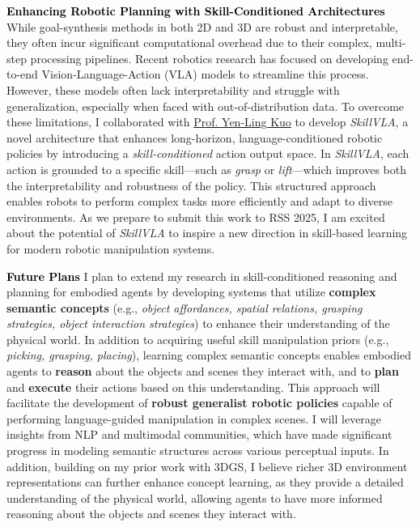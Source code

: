 \documentclass[10pt]{article}
\newcommand{\statement}[1]{\medskip\noindent
  \textcolor{black}{\textbf{#1}}\space
}
\begin{document}
\statement{Enhancing Robotic Planning with Skill-Conditioned Architectures} While goal-synthesis methods in both 2D and 3D are robust and interpretable, they often incur significant computational overhead due to their complex, multi-step processing pipelines. Recent robotics research has focused on developing end-to-end Vision-Language-Action (VLA) models to streamline this process. However, these models often lack interpretability and struggle with generalization, especially when faced with out-of-distribution data. To overcome these limitations, I collaborated with \href{https://yenlingkuo.com/}{Prof. Yen-Ling Kuo} to develop \textit{SkillVLA}, a novel architecture that enhances long-horizon, language-conditioned robotic policies by introducing a \textit{skill-conditioned} action output space. In \textit{SkillVLA}, each action is grounded to a specific skill—such as \textit{grasp} or \textit{lift}—which improves both the interpretability and robustness of the policy. This structured approach enables robots to perform complex tasks more efficiently and adapt to diverse environments. As we prepare to submit this work to RSS 2025, I am excited about the potential of \textit{SkillVLA} to inspire a new direction in skill-based learning for modern robotic manipulation systems.

\statement{Future Plans} I plan to extend my research in skill-conditioned reasoning and planning for embodied agents by developing systems that utilize \textbf{complex semantic concepts} (e.g., \textit{object affordances, spatial relations, grasping strategies, object interaction strategies}) to enhance their understanding of the physical world. In addition to acquiring useful skill manipulation priors (e.g., \textit{picking, grasping, placing}), learning complex semantic concepts enables embodied agents to \textbf{reason} about the objects and scenes they interact with, and to \textbf{plan} and \textbf{execute} their actions based on this understanding. This approach will facilitate the development of \textbf{robust generalist robotic policies} capable of performing language-guided manipulation in complex scenes. I will leverage insights from NLP and multimodal communities, which have made significant progress in modeling semantic structures across various perceptual inputs. In addition, building on my prior work with 3DGS, I believe richer 3D environment representations can further enhance concept learning, as they provide a detailed understanding of the physical world, allowing agents to have more informed reasoning about the objects and scenes they interact with.
\end{document}
